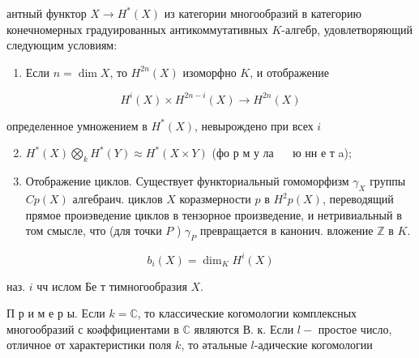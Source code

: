 \documentclass[10pt]{article}
\begin{document}
антный функтор $X \rightarrow H^{*}(X)$ из категории многообразий в категорию конечномерных градуированных антикоммутативных $K$-алгебр, удовлетворяющий следующим условиям:



\begin{enumerate}

  \item Если $n=\operatorname{dim} X$, то $H^{2 n}(X)$ изоморфно $K$, и отображение

\end{enumerate}



\[

H^{i}(X) \times H^{2 n-i}(X) \longrightarrow H^{2 n}(X)

\]



определенное умножением в $H^{*}(X)$, невырождено при всех $i$



\begin{enumerate}

  \setcounter{enumi}{1}

  \item $H^{*}(X) \bigotimes_{k} H^{*}(Y) \approx H^{*}(X \times Y)$ (фо р м у ла $\quad$ ю нн е т a);



  \item Отображение циклов. Существует функториальный гомоморфизм $\gamma_{X}$ группы $C p(X)$ алгебраич. циклов $X$ коразмерности $p$ в $H^{2} p(X)$, переводящий прямое проиэведение циклов в тензорное произведение, и нетривиальный в том смысле, что (для точки $P$ ) $\gamma_{P}$ превращается в канонич. вложение $\mathbb{Z}$ в $K$.



\end{enumerate}



\[

b_{i}(X)=\operatorname{dim}_{K} H^{i}(X)

\]



наз. $i$ чч ислом Бе т тимногообразия $X$.



П р и м е р ы. Если $k=\mathbb{C}$, то классические когомологии комплексных многообразий с коәффициентами в $\mathbb{C}$ являются В. к. Если $l-$ простое число, отличное от характеристики поля $k$, то әтальные $l$-адические когомологии
\end{document}
